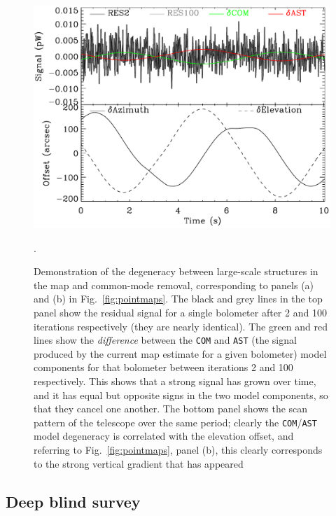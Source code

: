 \documentclass[useAMS,usenatbib,nofootinbib]{mn2e}
\newcommand{\model}[1]{\texttt{#1}}
\begin{document}
\begin{figure}
\centering
\includegraphics[width=\linewidth]{degeneracy.pdf}
\caption{Demonstration of the degeneracy between large-scale
  structures in the map and common-mode removal, corresponding to
  panels (a) and (b) in Fig.~\ref{fig:pointmaps}. The black and grey
  lines in the top panel show the residual signal for a single
  bolometer after 2 and 100 iterations respectively (they are nearly
  identical). The green and red lines show the \emph{difference}
  between the \model{COM} and \model{AST} (the signal produced by the
  current map estimate for a given bolometer) model components for
  that bolometer between iterations 2 and 100 respectively. This shows
  that a strong signal has grown over time, and it has equal but
  opposite signs in the two model components, so that they cancel one
  another. The bottom panel shows the scan pattern of the telescope
  over the same period; clearly the \model{COM}/\model{AST} model
  degeneracy is correlated with the elevation offset, and referring to
  Fig.~\ref{fig:pointmaps}, panel (b), this clearly corresponds to the
  strong vertical gradient that has appeared}.
\label{fig:degeneracy}
\end{figure}

\subsection{Deep blind survey}
\label{sec:cosmo}
\end{document}
